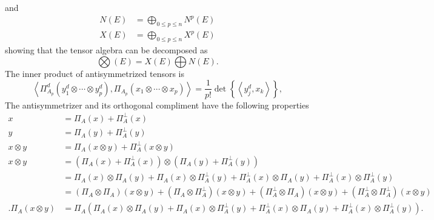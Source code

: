 \documentclass[aps,preprint]{revtex4}%
\begin{document}
and%
\begin{align}
N\left(  E\right)   &  =%
{\textstyle\bigoplus\limits_{0\leq p\leq n}}
N^{p}\left(  E\right)  \\
X\left(  E\right)   &  =%
{\textstyle\bigoplus\limits_{0\leq p\leq n}}
X^{p}\left(  E\right)
\end{align}
showing that the tensor algebra can be decomposed as
\begin{equation}%
{\textstyle\bigotimes}
\left(  E\right)  =X\left(  E\right)
{\textstyle\bigoplus}
N\left(  E\right)  .
\end{equation}
The inner product of antisymmetrized tensors is
\begin{equation}
\left\langle \Pi_{A_{p}}^{d}\left(  y_{1}^{d}\otimes\cdots\otimes y_{p}%
^{d}\right)  ,\Pi_{A_{p}}\left(  x_{1}\otimes\cdots\otimes x_{p}\right)
\right\rangle =\frac{1}{p!}\det\left\{  \left\langle y_{j}^{d},x_{k}%
\right\rangle \right\}  ,
\end{equation}
The antisymmetrizer and its orthogonal compliment have the following
properties
\begin{align}
x &  =\Pi_{A}\left(  x\right)  +\Pi_{A}^{\bot}\left(  x\right)  \\
y &  =\Pi_{A}\left(  y\right)  +\Pi_{A}^{\bot}\left(  y\right)  \\
x\otimes y &  =\Pi_{A}\left(  x\otimes y\right)  +\Pi_{A}^{\bot}\left(
x\otimes y\right)  \\
x\otimes y &  =\left(  \Pi_{A}\left(  x\right)  +\Pi_{A}^{\bot}\left(
x\right)  \right)  \otimes\left(  \Pi_{A}\left(  y\right)  +\Pi_{A}^{\bot
}\left(  y\right)  \right)  \\
&  =\Pi_{A}\left(  x\right)  \otimes\Pi_{A}\left(  y\right)  +\Pi_{A}\left(
x\right)  \otimes\Pi_{A}^{\bot}\left(  y\right)  +\Pi_{A}^{\bot}\left(
x\right)  \otimes\Pi_{A}\left(  y\right)  +\Pi_{A}^{\bot}\left(  x\right)
\otimes\Pi_{A}^{\bot}\left(  y\right)  \\
&  =\left(  \Pi_{A}\otimes\Pi_{A}\right)  \left(  x\otimes y\right)  +\left(
\Pi_{A}\otimes\Pi_{A}^{\bot}\right)  \left(  x\otimes y\right)  +\left(
\Pi_{A}^{\bot}\otimes\Pi_{A}\right)  \left(  x\otimes y\right)  +\left(
\Pi_{A}^{\bot}\otimes\Pi_{A}^{\bot}\right)  \left(  x\otimes y\right)  \\
.\Pi_{A}\left(  x\otimes y\right)   &  =\Pi_{A}\left(  \Pi_{A}\left(
x\right)  \otimes\Pi_{A}\left(  y\right)  +\Pi_{A}\left(  x\right)  \otimes
\Pi_{A}^{\bot}\left(  y\right)  +\Pi_{A}^{\bot}\left(  x\right)  \otimes
\Pi_{A}\left(  y\right)  +\Pi_{A}^{\bot}\left(  x\right)  \otimes\Pi_{A}%
^{\bot}\left(  y\right)  \right)  .
\end{align}
\end{document}
